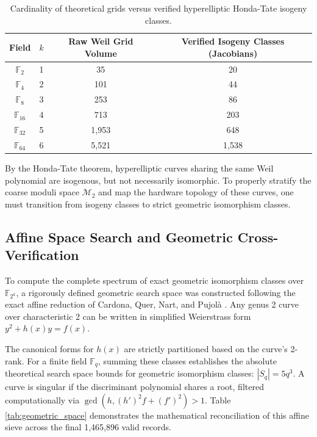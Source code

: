 \documentclass[11pt,letterpaper]{article}
\begin{document}
\begin{table}[h!]
\centering
\begin{tabular}{cccc}
\toprule
Field & $k$ & Raw Weil Grid Volume & Verified Isogeny Classes (Jacobians) \\
\midrule
$\mathbb{F}_2$ & 1 & 35 & 20 \\
$\mathbb{F}_4$ & 2 & 101 & 44 \\
$\mathbb{F}_8$ & 3 & 253 & 86 \\
$\mathbb{F}_{16}$ & 4 & 713 & 203 \\
$\mathbb{F}_{32}$ & 5 & 1,953 & 648 \\
$\mathbb{F}_{64}$ & 6 & 5,521 & 1,538 \\
\bottomrule
\end{tabular}
\caption{Cardinality of theoretical grids versus verified hyperelliptic Honda-Tate isogeny classes.}
\label{tab:isogeny_classes}
\end{table}

By the Honda-Tate theorem, hyperelliptic curves sharing the same Weil polynomial are isogenous, but not necessarily isomorphic. To properly stratify the coarse moduli space $\mathcal{M}_2$ \cite{Zobernig2021} and map the hardware topology of these curves, one must transition from isogeny classes to strict geometric isomorphism classes.

\subsection{Affine Space Search and Geometric Cross-Verification}
To compute the complete spectrum of exact geometric isomorphism classes over $\mathbb{F}_{2^k}$, a rigorously defined geometric search space was constructed following the exact affine reduction of Cardona, Quer, Nart, and Pujolà \cite{Cardona2005}. Any genus 2 curve over characteristic 2 can be written in simplified Weierstrass form $y^2 + h(x)y = f(x)$. 

The canonical forms for $h(x)$ are strictly partitioned based on the curve's 2-rank. For a finite field $\mathbb{F}_q$, summing these classes establishes the absolute theoretical search space bounds for geometric isomorphism classes: $|S_q| = 5q^3$. A curve is singular if the discriminant polynomial shares a root, filtered computationally via $\gcd(h, (h')^2f + (f')^2) > 1$. Table \ref{tab:geometric_space} demonstrates the mathematical reconciliation of this affine sieve across the final 1,465,896 valid records.
\end{document}
